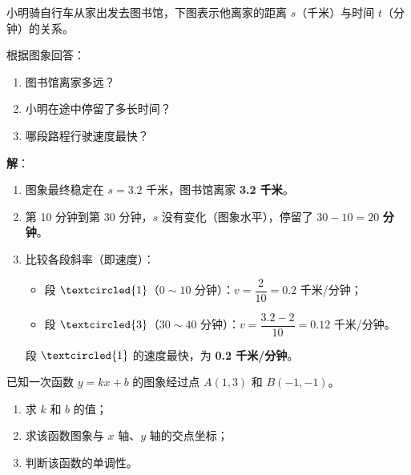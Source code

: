 \documentclass[12pt, a4paper]{ctexart}
\begin{document}
\begin{examplebox}[【例题5】从图象读信息]
小明骑自行车从家出发去图书馆，下图表示他离家的距离 $s$（千米）与时间 $t$（分钟）的关系。
\begin{center}
\end{center}
根据图象回答：
\begin{enumerate}[label=(\arabic*)]
  \item 图书馆离家多远？
  \item 小明在途中停留了多长时间？
  \item 哪段路程行驶速度最快？
\end{enumerate}
\end{examplebox}

\textbf{解}：
\begin{enumerate}[label=(\arabic*)]
  \item 图象最终稳定在 $s=3.2$ 千米，图书馆离家 \textbf{3.2 千米}。
  \item 第 10 分钟到第 30 分钟，$s$ 没有变化（图象水平），停留了 $30-10=20$ \textbf{分钟}。
  \item 比较各段斜率（即速度）：
        \begin{itemize}
          \item 段 $\textcircled{1}$（$0\sim10$ 分钟）：$v=\dfrac{2}{10}=0.2$ 千米/分钟；
          \item 段 $\textcircled{3}$（$30\sim40$ 分钟）：$v=\dfrac{3.2-2}{10}=0.12$ 千米/分钟。
        \end{itemize}
        段 $\textcircled{1}$ 的速度最快，为 \textbf{0.2 千米/分钟}。
\end{enumerate}

\begin{examplebox}[【例题6】一次函数综合]
已知一次函数 $y = kx + b$ 的图象经过点 $A(1, 3)$ 和 $B(-1, -1)$。
\begin{enumerate}[label=(\arabic*)]
  \item 求 $k$ 和 $b$ 的值；
  \item 求该函数图象与 $x$ 轴、$y$ 轴的交点坐标；
  \item 判断该函数的单调性。
\end{enumerate}
\end{examplebox}
\end{document}
